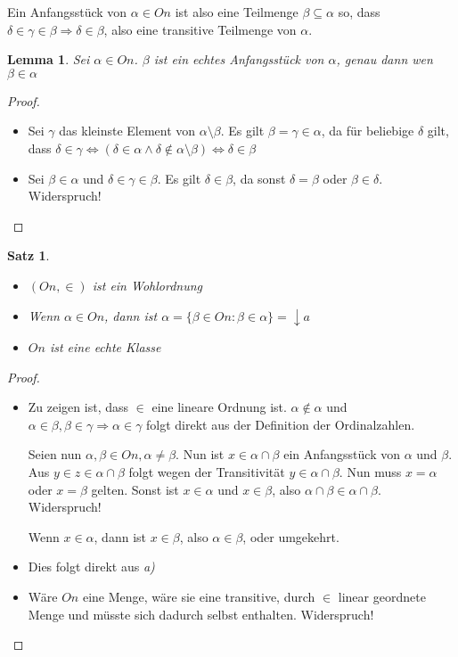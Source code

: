 \documentclass[german]{article}
\theoremstyle{break}
\theoremstyle{def_style}
\theoremstyle{def_style}
\newtheorem{satz}{Satz}[section]
\theoremstyle{lemma_style}
\newtheorem{lemma}{Lemma}[subsection]
\begin{document}
Ein Anfangsstück von $\alpha \in On$ ist also eine Teilmenge $\beta\subseteq \alpha$ so, dass $\delta\in\gamma\in \beta\Rightarrow \delta\in\beta$, also eine transitive Teilmenge von $\alpha$.

\begin{lemma}
	Sei $\alpha\in On$. $\beta$ ist ein echtes Anfangsstück von $\alpha$, genau dann wen $\beta \in \alpha$
\end{lemma}
\begin{proof}
	\begin{itemize}
		\item[$\Rightarrow$:] Sei $\gamma$ das kleinste Element von $\alpha\setminus \beta$. 
		Es gilt $\beta=\gamma\in \alpha$, da für beliebige $\delta$ gilt, dass $\delta\in\gamma \Leftrightarrow (\delta\in\alpha \land \delta\notin\alpha\setminus\beta) \Leftrightarrow \delta\in\beta$
		\item[$\Leftarrow$:] Sei $\beta\in\alpha$ und $\delta\in\gamma\in\beta$. Es gilt $\delta\in\beta$, da sonst $\delta=\beta$ oder $\beta\in\delta$. Widerspruch!
	\end{itemize}
\end{proof}

\begin{satz}
	\begin{itemize}
		\item[a)] $(On,\in)$ ist ein Wohlordnung
		\item[b)] Wenn $\alpha\in On$, dann ist $\alpha=\{\beta\in On:\beta\in\alpha\}=\downarrow a$
		\item[c)] $On$ ist eine echte Klasse
	\end{itemize}
\end{satz}
\begin{proof}
	\begin{itemize}
		\item[a)] Zu zeigen ist, dass $\in$ eine lineare Ordnung ist. $\alpha \notin \alpha$ und $\alpha\in\beta, \beta\in \gamma\Rightarrow \alpha\in\gamma$ folgt direkt aus der Definition der Ordinalzahlen.
		
		Seien nun $\alpha,\beta\in On, \alpha\neq\beta$. Nun ist $x\in\alpha\cap\beta$ ein Anfangsstück von $\alpha$ und $\beta$. 
		Aus $y\in z \in \alpha\cap \beta$ folgt wegen der Transitivität $y\in\alpha\cap \beta$. Nun muss $x=\alpha$ oder $x=\beta$ gelten. Sonst ist $x\in \alpha$ und $x\in\beta$, also $\alpha\cap\beta \in \alpha\cap\beta$. Widerspruch!
		
		Wenn $x\in\alpha$, dann ist $x\in\beta$, also $\alpha \in \beta$, oder umgekehrt.
		
		\item[b)] Dies folgt direkt aus \textit{a)}
		
		\item[c)] Wäre $On$ eine Menge, wäre sie eine transitive, durch $\in$ linear geordnete Menge und müsste sich dadurch selbst enthalten. Widerspruch!
	\end{itemize}
\end{proof}
\end{document}
